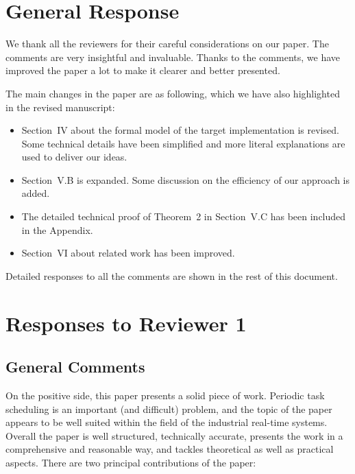 \documentclass[10pt,journal]{IEEEtran}
\newcommand{\hide}[1]{\ignorespaces}
\newcommand{\COMMENT}{\medskip\noindent{\bf COMMENT: }}
\begin{document}
\section{General Response}
We thank all the reviewers for their careful considerations on our
paper. The comments are very insightful and invaluable. Thanks to the
comments, we have improved the paper a lot to make it clearer and
better presented.

The main changes in the paper are as following, which we have also
highlighted in the revised manuscript:
\begin{itemize}
\item
Section~IV about the formal model of the target implementation is
revised. Some technical details have been simplified and more literal
explanations are used to deliver our ideas.

\item
Section~V.B is expanded. Some discussion on the efficiency of our
approach is added.

\item 
The detailed technical proof of Theorem~2 in Section~V.C has been
included in the Appendix.

\item
Section~VI about related work has been improved. 
\end{itemize}

Detailed responses to all the comments are shown in the rest of this
document.


\section{Responses to Reviewer 1}
\subsection{General Comments}

\hide{ The paper shows a realistic implementation of a Rate-Monotonic
  Scheduling algorithm using Real-Time Maude (a modeling language
  based on rewriting logic) by taking into account the overhead of
  scheduling and some other details of the hardware platform. The
  correctness of the implementation with respect to the algorithm and
  the completeness of the model are verified by model checking, and
  validated within different realistic scenarios.}  

\COMMENT 

On the positive side, this paper presents a solid piece of
work. Periodic task scheduling is an important (and difficult)
problem, and the topic of the paper appears to be well suited within
the field of the industrial real-time systems. Overall the paper is
well structured, technically accurate, presents the work in a
comprehensive and reasonable way, and tackles theoretical as well as
practical aspects. There are two principal contributions of the paper:
\end{document}

